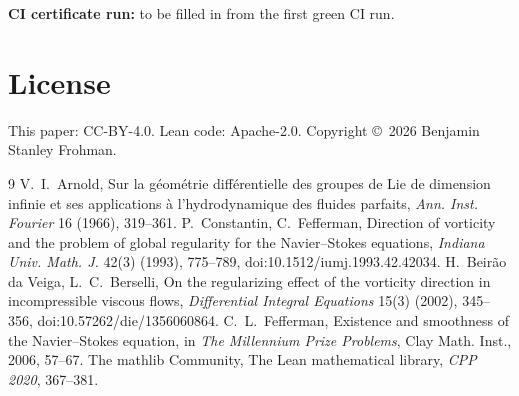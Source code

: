 \documentclass[11pt]{article}
\theoremstyle{definition}
\theoremstyle{remark}
\begin{document}
\noindent\textbf{CI certificate run:} to be filled in from the first green CI run.

\section*{License}
This paper: CC-BY-4.0. Lean code: Apache-2.0. Copyright \copyright\ 2026
Benjamin Stanley Frohman.

\begin{thebibliography}{9}
 V.~I.~Arnold, Sur la géométrie différentielle des groupes de
Lie de dimension infinie et ses applications à l'hydrodynamique des fluides
parfaits, \emph{Ann. Inst. Fourier} 16 (1966), 319--361.
 P.~Constantin, C.~Fefferman, Direction of vorticity and the
problem of global regularity for the Navier--Stokes equations,
\emph{Indiana Univ. Math. J.} 42(3) (1993), 775--789,
doi:10.1512/iumj.1993.42.42034.
 H.~Beirão da Veiga, L.~C.~Berselli, On the regularizing effect
of the vorticity direction in incompressible viscous flows,
\emph{Differential Integral Equations} 15(3) (2002), 345--356,
doi:10.57262/die/1356060864.
 C.~L.~Fefferman, Existence and smoothness of the
Navier--Stokes equation, in \emph{The Millennium Prize Problems}, Clay Math.
Inst., 2006, 57--67.
 The mathlib Community, The Lean mathematical library,
\emph{CPP 2020}, 367--381.
\end{thebibliography}
\end{document}
